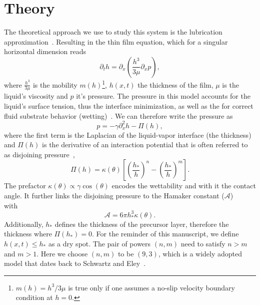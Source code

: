 \documentclass[twocolumn,amsmath,amssymb,showpacs,pre,nofootinbib,superscriptaddress]{revtex4-1} %
\begin{document}
\section{Theory}\label{sec:theory}
The theoretical approach we use to study this system is the lubrication approximation~\cite{Reynolds, RevModPhys.69.931, PhysRevE.63.011208}.
Resulting in the thin film equation, which for a singular horizontal dimension reads~\cite{RevModPhys.81.739, RevModPhys.81.1131, THIELE2014399}
\begin{equation}\label{eq:thin_film_simple}
    \partial_t h = \partial_x \left(\frac{h^3}{3\mu}\partial_x p\right),
\end{equation}
where $\frac{h^3}{3\mu}$ is the mobility $m(h)$\footnote{$m(h) = h^3/3\mu$ is true only if one assumes a no-slip velocity boundary condition at $h=0$.}, $h(x,t)$ the thickness of the film, $\mu$ is the liquid's viscosity and $p$ it's pressure.
The pressure in this model accounts for the liquid's surface tension, thus the interface minimization, as well as the for correct fluid substrate behavior (wetting)~\cite{PhysRevE.100.033313}.
We can therefore write the pressure as
\begin{equation}\label{eq:pressure}
    p = -\gamma \partial_x^2 h - \Pi(h),
\end{equation}
where the first term is the Laplacian of the liquid-vapor interface (the thickness) and $\Pi(h)$ is the derivative of an interaction potential that is often referred to as disjoining pressure~\cite{RevModPhys.69.931, RevModPhys.81.739, Peschka9275, PhysRevE.63.011208},
\begin{equation}\label{eq:disjoin}
    \Pi(h) = \kappa(\theta)\left[\left(\frac{h_{\ast}}{h}\right)^n - \left(\frac{h_{\ast}}{h}\right)^m\right].
\end{equation}
The prefactor $\kappa(\theta)\propto \gamma\cos(\theta)$ encodes the wettability and with it the contact angle.
It further links the disjoining pressure to the Hamaker constant ($\mathcal{A}$) with~~\cite{PhysRevE.93.013120}
\begin{equation}
    \mathcal{A} = 6\pi h_{\ast}^3\kappa(\theta).    
\end{equation}
Additionally, $h_{\ast}$ defines the thickness of the precursor layer, therefore the thickness where $\Pi(h_{\ast}) = 0$.
For the reminder of this manuscript, we define $h(x,t) \le h_{\ast}$ as a dry spot.
The pair of powers $(n,m)$ need to satisfy $n > m$ and $m > 1$. 
Here we choose $(n,m)$ to be $(9,3)$, which is a widely adopted model that dates back to Schwartz and Eley~\cite{SCHWARTZ1998173, RevModPhys.81.739}.
\end{document}
